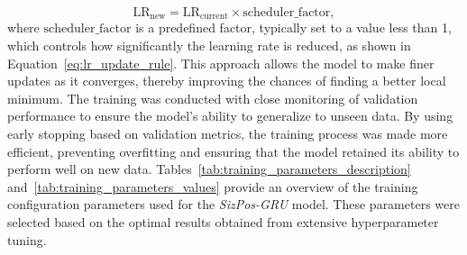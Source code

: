 \documentclass[12pt,oneside]{book} %
\begin{document}
\begin{equation}
    \text{LR}_{\text{new}} = \text{LR}_{\text{current}} \times \text{scheduler\_factor}, \label{eq:lr_update_rule}
\end{equation}
where \(\text{scheduler\_factor}\) is a predefined factor, typically set to a value less than 1, which controls how significantly the learning rate is reduced, as shown in Equation~\eqref{eq:lr_update_rule}. This approach allows the model to make finer updates as it converges, thereby improving the chances of finding a better local minimum. The training was conducted with close monitoring of validation performance to ensure the model's ability to generalize to unseen data. By using early stopping based on validation metrics, the training process was made more efficient, preventing overfitting and ensuring that the model retained its ability to perform well on new data. Tables~\ref{tab:training_parameters_description} and~\ref{tab:training_parameters_values} provide an overview of the training configuration parameters used for the \textit{SizPos-GRU} model. These parameters were selected based on the optimal results obtained from extensive hyperparameter tuning.
\end{document}
